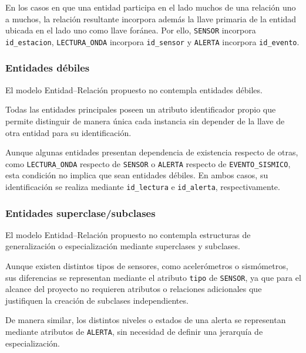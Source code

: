 \documentclass[12pt,a4paper]{article}
\begin{document}
En los casos en que una entidad participa en el lado muchos de una relación uno a muchos, la relación resultante incorpora además la llave primaria de la entidad ubicada en el lado uno como llave foránea. Por ello, \texttt{SENSOR} incorpora \texttt{id\_\allowbreak{}estacion}, \texttt{LECTURA\_\allowbreak{}ONDA} incorpora \texttt{id\_\allowbreak{}sensor} y \texttt{ALERTA} incorpora \texttt{id\_\allowbreak{}evento}.


\subsubsection{Entidades débiles}

El modelo Entidad--Relación propuesto no contempla entidades débiles.

Todas las entidades principales poseen un atributo identificador propio que permite distinguir de manera única cada instancia sin depender de la llave de otra entidad para su identificación.

Aunque algunas entidades presentan dependencia de existencia respecto de otras, como \texttt{LECTURA\_\allowbreak{}ONDA} respecto de \texttt{SENSOR} o \texttt{ALERTA} respecto de \texttt{EVENTO\_\allowbreak{}SISMICO}, esta condición no implica que sean entidades débiles. En ambos casos, su identificación se realiza mediante \texttt{id\_\allowbreak{}lectura} e \texttt{id\_\allowbreak{}alerta}, respectivamente.


\subsubsection{Entidades superclase/subclases}

El modelo Entidad--Relación propuesto no contempla estructuras de generalización o especialización mediante superclases y subclases.

Aunque existen distintos tipos de sensores, como acelerómetros o sismómetros, sus diferencias se representan mediante el atributo \texttt{tipo} de \texttt{SENSOR}, ya que para el alcance del proyecto no requieren atributos o relaciones adicionales que justifiquen la creación de subclases independientes.

De manera similar, los distintos niveles o estados de una alerta se representan mediante atributos de \texttt{ALERTA}, sin necesidad de definir una jerarquía de especialización.
\end{document}
